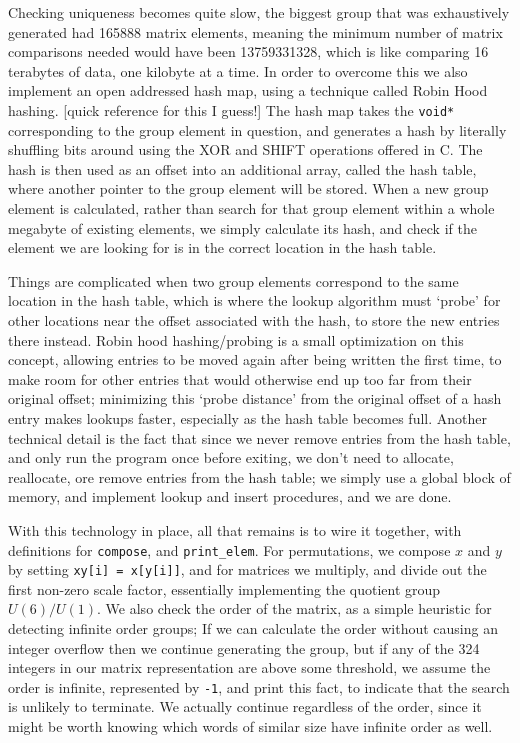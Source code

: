 Checking uniqueness becomes quite slow, the biggest group that was exhaustively generated had 165888 matrix elements, meaning the minimum number of matrix comparisons needed would have been 13759331328, which is like comparing 16 terabytes of data, one kilobyte at a time. In order to overcome this we also implement an open addressed hash map, using a technique called Robin Hood hashing. [quick reference for this I guess!] The hash map takes the \verb`void*` corresponding to the group element in question, and generates a hash by literally shuffling bits around using the XOR and SHIFT operations offered in C. The hash is then used as an offset into an additional array, called the hash table, where another pointer to the group element will be stored. When a new group element is calculated, rather than search for that group element within a whole megabyte of existing elements, we simply calculate its hash, and check if the element we are looking for is in the correct location in the hash table.

Things are complicated when two group elements correspond to the same location in the hash table, which is where the lookup algorithm must `probe' for other locations near the offset associated with the hash, to store the new entries there instead. Robin hood hashing/probing is a small optimization on this concept, allowing entries to be moved again after being written the first time, to make room for other entries that would otherwise end up too far from their original offset; minimizing this `probe distance' from the original offset of a hash entry makes lookups faster, especially as the hash table becomes full. Another technical detail is the fact that since we never remove entries from the hash table, and only run the program once before exiting, we don't need to allocate, reallocate, ore remove entries from the hash table; we simply use a global block of memory, and implement lookup and insert procedures, and we are done.

With this technology in place, all that remains is to wire it together, with definitions for \verb`compose`, and \verb`print_elem`. For permutations, we compose $x$ and $y$ by setting \verb`xy[i] = x[y[i]]`, and for matrices we multiply, and divide out the first non-zero scale factor, essentially implementing the quotient group $U(6)/U(1)$. We also check the order of the matrix, as a simple heuristic for detecting infinite order groups; If we can calculate the order without causing an integer overflow then we continue generating the group, but if any of the 324 integers in our matrix representation are above some threshold, we assume the order is infinite, represented by \verb`-1`, and print this fact, to indicate that the search is unlikely to terminate. We actually continue regardless of the order, since it might be worth knowing which words of similar size have infinite order as well.

